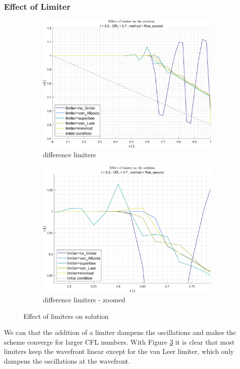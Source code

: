 \documentclass[11pt, a4paper]{article}
\begin{document}
\subsubsection{Effect of Limiter}
\begin{figure}[H]
    \centering
    \begin{subfigure}[c]{.49\textwidth}
        \centering
        \includegraphics[width=\textwidth]{images/grap7.png}
        \caption{difference limiters}
        \label{fig:roe_second_diff_limiters_A}
    \end{subfigure}
    \hfill
    \begin{subfigure}[c]{.49\textwidth}
        \centering
        \includegraphics[width=\textwidth]{images/grap7.1.png}
        \caption{difference limiters - zoomed}
        \label{fig:roe_second_diff_limiters_B}
    \end{subfigure}
    \caption{Effect of limiters on solution}
    \label{fig:roe_second_difference_limiters}
\end{figure}
We can that the addition of a limiter dampens the oscillations and makes the scheme converge for larger CFL numbers. With Figure \ref{fig:roe_second_difference_limiters} it is clear that most limiters keep the wavefront linear except for the van Leer limiter, which only dampens the oscillations at the wavefront.
\newpage
\end{document}
